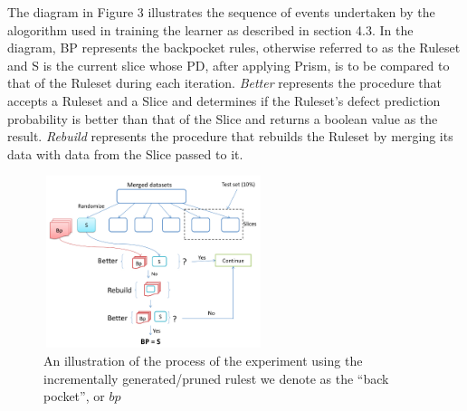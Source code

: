 \documentclass{sig-alternate}
\begin{document}
The diagram in Figure 3 illustrates the sequence of events undertaken by the alogorithm used in training the learner as described in section 4.3. In the diagram, BP represents the backpocket rules, otherwise referred to as the Ruleset and S is the current slice whose PD, after applying Prism, is to be compared to that of the Ruleset during each iteration. {\em Better} represents the procedure that accepts a Ruleset and a Slice and determines if the Ruleset's defect prediction probability is better than that of the Slice and returns a boolean value as the result. {\em Rebuild} represents the procedure that rebuilds the Ruleset by merging its data with data from the Slice passed to it.

\begin{figure}
\includegraphics[width=243, height=190]{flowchart.png}
\caption{An illustration of the process of the experiment using the incrementally generated/pruned rulest we denote as the ``back pocket'', or $bp$}
\end{figure}

\end{document}
